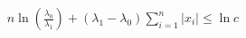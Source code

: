 \documentclass[preview]{standalone}
\begin{document}
\begin{align*}
n\ln\left(\frac{\lambda_0}{\lambda_1}\right) + (\lambda_1-\lambda_0)\sum_{i=1}^n |x_i| \leq \ln c
\end{align*}
\end{document}
